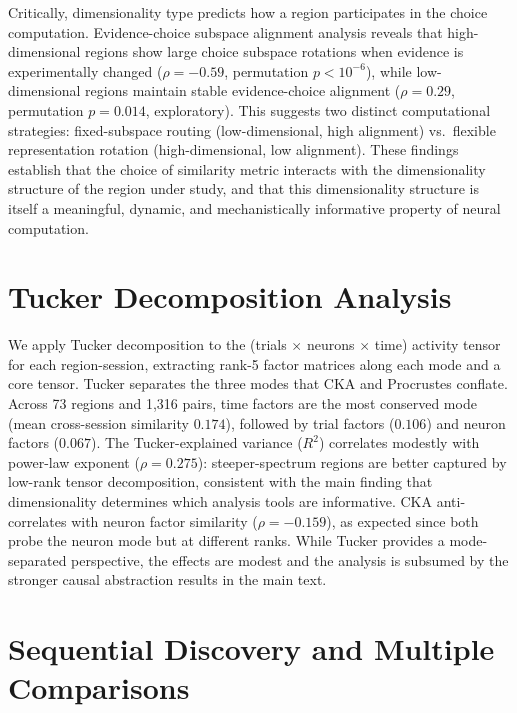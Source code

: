 \documentclass{article}
\begin{document}
Critically, dimensionality type predicts how a region participates in the choice computation. Evidence-choice subspace alignment analysis reveals that high-dimensional regions show large choice subspace rotations when evidence is experimentally changed ($\rho = -0.59$, permutation $p < 10^{-6}$), while low-dimensional regions maintain stable evidence-choice alignment ($\rho = 0.29$, permutation $p = 0.014$, exploratory). This suggests two distinct computational strategies: fixed-subspace routing (low-dimensional, high alignment) vs.\ flexible representation rotation (high-dimensional, low alignment). These findings establish that the choice of similarity metric interacts with the dimensionality structure of the region under study, and that this dimensionality structure is itself a meaningful, dynamic, and mechanistically informative property of neural computation.




\appendix
\section{Tucker Decomposition Analysis}
\label{app:tucker}

We apply Tucker decomposition \citep{tucker1966some} to the (trials $\times$ neurons $\times$ time) activity tensor for each region-session, extracting rank-5 factor matrices along each mode and a core tensor. Tucker separates the three modes that CKA and Procrustes conflate. Across 73 regions and 1,316 pairs, time factors are the most conserved mode (mean cross-session similarity $0.174$), followed by trial factors ($0.106$) and neuron factors ($0.067$). The Tucker-explained variance ($R^2$) correlates modestly with power-law exponent ($\rho = 0.275$): steeper-spectrum regions are better captured by low-rank tensor decomposition, consistent with the main finding that dimensionality determines which analysis tools are informative. CKA anti-correlates with neuron factor similarity ($\rho = -0.159$), as expected since both probe the neuron mode but at different ranks. While Tucker provides a mode-separated perspective, the effects are modest and the analysis is subsumed by the stronger causal abstraction results in the main text.

\section{Sequential Discovery and Multiple Comparisons}
\label{app:sequential}
\end{document}
